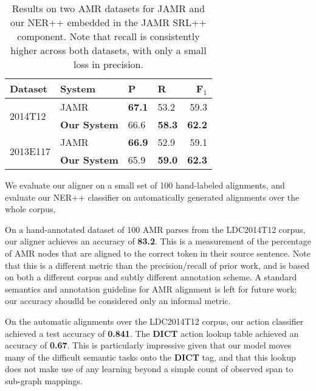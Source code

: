 \documentclass[11pt]{article}
\begin{document}

\begin{table}[t]
\begin{center}
\begin{tabular}{l|l|llr}
\textbf{Dataset} &  \textbf{System} & \textbf{P} & \textbf{R} & \textbf{F$_1$} \\
\hline
\multirow{2}{*}{2014T12} & JAMR & \textbf{67.1} & 53.2 & 59.3 \\
  & \textbf{Our System} & 66.6 & \textbf{58.3} & \textbf{62.2} \\
\hline
\multirow{2}{*}{2013E117} & JAMR & \textbf{66.9} & 52.9 & 59.1 \\
  & \textbf{Our System} & 65.9 & \textbf{59.0} & \textbf{62.3} \\
\end{tabular}
\end{center}
\caption{\label{tab:results} 
Results on two AMR datasets for JAMR and our NER++ embedded in the JAMR SRL++
  component.
Note that recall is consistently higher across both datasets, with only a small
  loss in precision.
}
\end{table}

We evaluate our aligner on a small set of 100 hand-labeled alignments,
  and evaluate our NER++ classifier on automatically generated alignments over the whole corpus,
  
On a hand-annotated dataset of 100 AMR parses from the LDC2014T12 corpus, our aligner achieves
  an accuracy of \textbf{83.2}.
This is a measurement of the percentage of AMR nodes that are
  aligned to the correct token in their source sentence.
Note that this is a different metric than the precision/recall of prior work, and
  is based on both a different corpus and subtly different annotation scheme.
A standard semantics and annotation guideline for AMR alignment is left for 
  future work; our accuracy shoudld be considered only an informal metric.


On the automatic alignments over the LDC2014T12 corpus,
  our action classifier achieved a test accuracy of \textbf{0.841}.
The \textbf{DICT} action lookup table achieved an accuracy of \textbf{0.67}.
This is particularly impressive given that our model moves many of the difficult 
  semantic tasks onto the \textbf{DICT} tag, and that this lookup does not make
  use of any learning beyond a simple count of observed span to sub-graph mappings.
\end{document}
